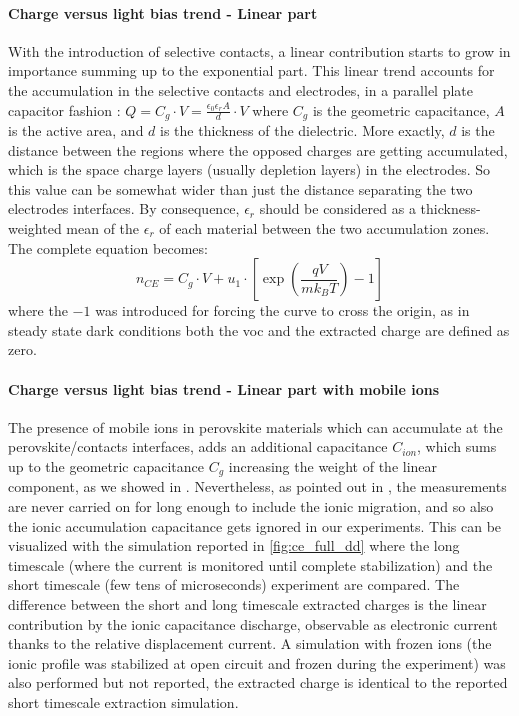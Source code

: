 \paragraph{Charge versus light bias trend - Linear part}
With the introduction of selective contacts, a linear contribution starts to grow in importance summing up to the exponential part.
This linear trend accounts for the accumulation in the selective contacts and electrodes, in a parallel plate capacitor fashion \cite{Gelmetti2017,Ryan2017a,Wheeler2017,Du2018}: $Q = C_g \cdot V = \frac{\epsilon_0 \epsilon_r A}{d} \cdot V$ where $C_g$ is the geometric capacitance, $A$ is the active area, and $d$ is the thickness of the dielectric.
More exactly, $d$ is the distance between the regions where the opposed charges are getting accumulated, which is the space charge layers (usually depletion layers) in the electrodes.
So this value can be somewhat wider than just the distance separating the two electrodes interfaces.
By consequence, $\epsilon_r$ should be considered as a thickness-weighted mean of the $\epsilon_r$ of each material between the two accumulation zones.
The complete equation becomes:
\begin{equation}\label{eq:ce_full}
n_{CE} = C_g \cdot V + u_1 \cdot \left[\exp\left(\frac{qV}{mk_BT}\right) - 1\right]
\end{equation}
where the $-1$ was introduced for forcing the curve to cross the origin, as in steady state dark conditions both the \gls{voc} and the extracted charge are defined as zero.

\paragraph{Charge versus light bias trend - Linear part with mobile ions}
The presence of mobile ions in perovskite materials which can accumulate at the perovskite/contacts interfaces, adds an additional capacitance $C_{ion}$, which sums up to the geometric capacitance $C_g$ increasing the weight of the linear component, as we showed in .
Nevertheless, as pointed out in , the  measurements are never carried on for long enough to include the ionic migration, and so also the ionic accumulation capacitance gets ignored in our experiments.
This can be visualized with the simulation reported in \cref{fig:ce_full_dd} where the long timescale (where the current is monitored until complete stabilization) and the short timescale (few tens of microseconds)  experiment are compared.
The difference between the short and long timescale extracted charges is the linear contribution by the ionic capacitance discharge, observable as electronic current thanks to the relative displacement current.
A simulation with frozen ions (the ionic profile was stabilized at open circuit and frozen during the  experiment) was also performed but not reported, the extracted charge is identical to the reported short timescale extraction simulation.

